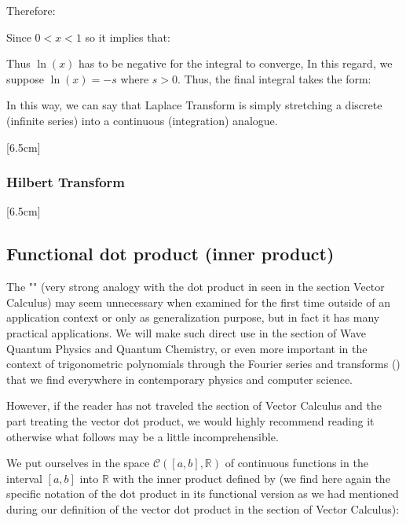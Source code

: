 	Therefore:
	 
	Since $0<x<1 $ so it implies that:
	
	Thus $\ln(x)$ has to be negative for the integral to converge, In this regard, we suppose $\ln(x)=-s$ where $s>0$. Thus, the final integral takes the form:
	
	In this way, we can say that Laplace Transform is simply  stretching a discrete (infinite series)  into a continuous (integration) analogue. 
	
	[6.5cm]
	
	\subsubsection{Hilbert Transform}
	[6.5cm]
	
	\subsection{Functional dot product (inner product)}\label{functional dot product}
	The "" (very strong analogy with the dot product in seen in the section Vector Calculus) may seem unnecessary when examined for the first time outside of an application context or only as generalization purpose, but in fact it has many practical applications. We will make such direct use in the section of Wave Quantum Physics and Quantum Chemistry, or even more important in the context of trigonometric polynomials through the Fourier series and transforms () that we find everywhere in contemporary physics and computer science.
	
	However, if the reader has not traveled the section of Vector Calculus and the part treating the vector dot product, we would highly recommend reading it otherwise what follows may be a little incomprehensible.
	
	We put ourselves in the space $\mathcal{C}([a,b],\mathbb{R})$ of continuous functions in the interval $[a, b]$ into $\mathbb{R}$ with the inner product defined by (we find here again the specific notation of the dot product in its functional version as we had mentioned during our definition of the vector dot product in the section of Vector Calculus):
	

